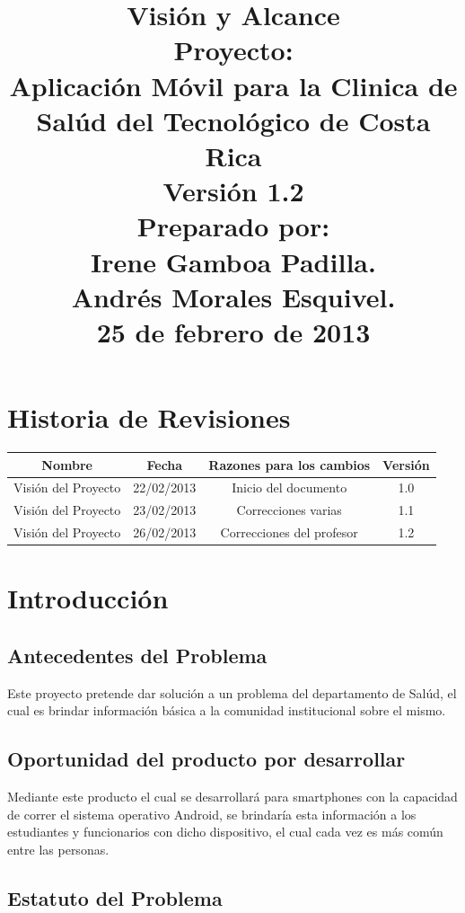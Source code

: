 \documentclass[12pt]{article}
\title{\begin{flushright}\textbf{Visi\'on y Alcance} \\[0.7in] 
		Proyecto: \\[0.2in]
		\textbf{Aplicaci\'on M\'ovil para la Clinica de Sal\'ud del Tecnol\'ogico de Costa Rica}\\[0.7in]
		Versi\'on 1.2 \\[0.7in]
		Preparado por: \\[0.2in]
		\textbf{Irene Gamboa Padilla.\\
		Andr\'es Morales Esquivel.} \\[0.7in]
		25 de febrero de 2013
		\end{flushright}}
\author{}
\date{}
\begin{document}
\maketitle
\newpage
\renewcommand{\contentsname}{Tabla de Contenido}
\tableofcontents


\section{Historia de Revisiones}

\begin{tabular}{|c|c|c|c|}
\hline
	\textbf{Nombre} & \textbf{Fecha} & \textbf{Razones para los cambios} & \textbf{Versi\'on}\\
\hline
	Visi\'on del Proyecto & 22/02/2013 & Inicio del documento & 1.0\\
\hline
	 Visi\'on del Proyecto & 23/02/2013 & Correcciones varias & 1.1\\	 
\hline
	 Visi\'on del Proyecto & 26/02/2013 & Correcciones del profesor & 1.2\\
\hline
\end{tabular}

\newpage

\section{Introducci\'on}

\subsection{Antecedentes del Problema}

Este proyecto pretende dar soluci\'on a un problema del departamento de Sal\'ud, el cual es brindar informaci\'on b\'asica a la comunidad institucional sobre el mismo.

\subsection{Oportunidad del producto por desarrollar}

Mediante este producto el cual se desarrollar\'a para smartphones con la capacidad de correr el sistema operativo Android, se brindar\'ia esta informaci\'on a los estudiantes y funcionarios con dicho dispositivo, el cual cada vez es m\'as com\'un entre las personas.

\subsection{Estatuto del Problema}
\end{document}
